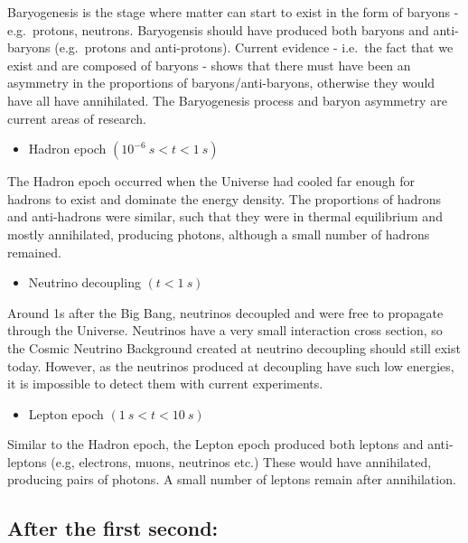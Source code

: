 \documentclass[11pt,a4paper,notoc]{tufte-handout}
\providecommand{\tightlist}{%
  \setlength{\itemsep}{0pt}\setlength{\parskip}{0pt}}
\begin{document}
Baryogenesis is the stage where matter can start to exist in the form of
baryons - e.g.~protons, neutrons. Baryogensis should have produced both
baryons and anti-baryons (e.g.~protons and anti-protons). Current
evidence - i.e.~the fact that we exist and are composed of baryons -
shows that there must have been an asymmetry in the proportions of
baryons/anti-baryons, otherwise they would have all have annihilated.
The Baryogenesis process and baryon asymmetry are current areas of
research.

\begin{itemize}
\tightlist
\item
  Hadron epoch \((10^{-6}~s < t < 1~s)\)
\end{itemize}

The Hadron epoch occurred when the Universe had cooled far enough for
hadrons to exist and dominate the energy density. The proportions of
hadrons and anti-hadrons were similar, such that they were in thermal
equilibrium and mostly annihilated, producing photons, although a small
number of hadrons remained.

\begin{itemize}
\tightlist
\item
  Neutrino decoupling \((t < 1~s)\)
\end{itemize}

Around 1s after the Big Bang, neutrinos decoupled and were free to
propagate through the Universe. Neutrinos have a very small interaction
cross section, so the Cosmic Neutrino Background created at neutrino
decoupling should still exist today. However, as the neutrinos produced
at decoupling have such low energies, it is impossible to detect them
with current experiments.

\begin{itemize}
\tightlist
\item
  Lepton epoch \((1~s < t < 10~s)\)
\end{itemize}

Similar to the Hadron epoch, the Lepton epoch produced both leptons and
anti-leptons (e.g, electrons, muons, neutrinos etc.) These would have
annihilated, producing pairs of photons. A small number of leptons
remain after annihilation.

\hypertarget{sec:after_1s}{%
\subsection{After the first second:}\label{sec:after_1s}}
\end{document}
